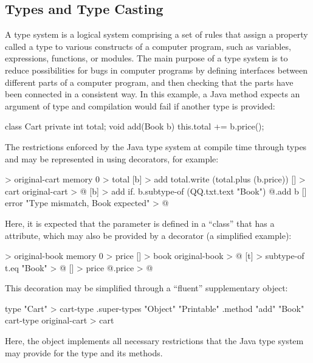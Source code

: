 \documentclass[sigplan,nonacm]{acmart}
\begin{document}
\subsection{Types and Type Casting}
\label{sec:types}

A type system is a logical system comprising a set of rules that assign a property called a type to various constructs of a computer program, such as variables, expressions, functions, or modules. The main purpose of a type system is to reduce possibilities for bugs in computer programs by defining interfaces between different parts of a computer program, and then checking that the parts have been connected in a consistent way. In this example, a Java method  expects an argument of type  and compilation would fail if another type is provided:

\begin{ffcode}
class Cart {
  private int total;
  void add(Book b) {
    this.total += b.price();
  }
}
\end{ffcode}

The restrictions enforced by the Java type system at compile time through types  and  may be represented in \eolang{} using decorators, for example:

\begin{ffcode}
[] > original-cart
  memory 0 > total
  [b] > add
    total.write (total.plus (b.price))
[] > cart
  original-cart > @
  [b] > add
    if.
      b.subtype-of (QQ.txt.text "Book")
      @.add b
      []
        error "Type mismatch, Book expected" > @
\end{ffcode}

Here, it is expected that the parameter  is defined in a ``class'' that has a  attribute, which may also be provided by a decorator (a simplified example):

\begin{ffcode}
[] > original-book
  memory 0 > price
[] > book
  original-book > @
  [t] > subtype-of
    t.eq "Book" > @
  [] > price
    @.price > @
\end{ffcode}

This decoration may be simplified through a ``fluent'' supplementary object:

\begin{ffcode}
type "Cart" > cart-type
.super-types "Object" "Printable"
.method "add" "Book"
cart-type original-cart > cart
\end{ffcode}

Here, the  object implements all necessary restrictions that the Java type system may provide for the type  and its methods.
\end{document}
